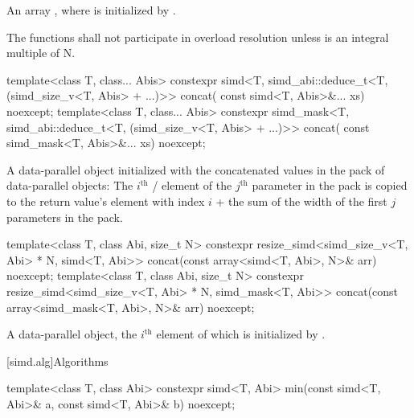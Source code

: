 \begin{itemdescr}
  \pnum\returns
  An array , where  is initialized by .

  \pnum\remarks
  The functions shall not participate in overload resolution unless  is an integral multiple of \tcode N.
\end{itemdescr}

\begin{itemdecl}
template<class T, class... Abis>
  constexpr simd<T, simd_abi::deduce_t<T, (simd_size_v<T, Abis> + ...)>> concat(
    const simd<T, Abis>&... xs) noexcept;
template<class T, class... Abis>
  constexpr simd_mask<T, simd_abi::deduce_t<T, (simd_size_v<T, Abis> + ...)>> concat(
    const simd_mask<T, Abis>&... xs) noexcept;
\end{itemdecl}

\begin{itemdescr}
  \pnum\returns
  A data-parallel object initialized with the concatenated values in the  pack of data-parallel objects: The $i^\text{th}$ / element of the $j^\text{th}$ parameter in the  pack is copied to the return value's element with index $i$ + the sum of the width of the first $j$ parameters in the  pack.
\end{itemdescr}

\begin{itemdecl}
  template<class T, class Abi, size_t N>
    constexpr resize_simd<simd_size_v<T, Abi> * N, simd<T, Abi>>
      concat(const array<simd<T, Abi>, N>& arr) noexcept;
  template<class T, class Abi, size_t N>
    constexpr resize_simd<simd_size_v<T, Abi> * N, simd_mask<T, Abi>>
      concat(const array<simd_mask<T, Abi>, N>& arr) noexcept;
\end{itemdecl}

\begin{itemdescr}
  \pnum\returns
  A data-parallel object, the $i^\text{th}$ element of which is initialized by .
\end{itemdescr}

[simd.alg]{Algorithms}

\begin{itemdecl}
template<class T, class Abi> constexpr simd<T, Abi> min(const simd<T, Abi>& a, const simd<T, Abi>& b) noexcept;
\end{itemdecl}

